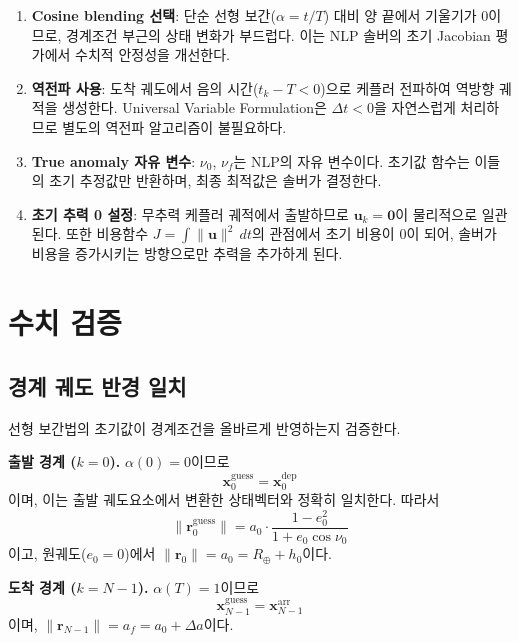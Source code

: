 \documentclass[11pt]{article}
\begin{document}
\begin{enumerate}[nosep]
  \item \textbf{Cosine blending 선택}: 단순 선형 보간($\alpha = t/T$) 대비 양 끝에서 기울기가 0이므로, 경계조건 부근의 상태 변화가 부드럽다. 이는 NLP 솔버의 초기 Jacobian 평가에서 수치적 안정성을 개선한다.

  \item \textbf{역전파 사용}: 도착 궤도에서 음의 시간($t_k - T < 0$)으로 케플러 전파하여 역방향 궤적을 생성한다. Universal Variable Formulation은 $\Delta t < 0$을 자연스럽게 처리하므로 별도의 역전파 알고리즘이 불필요하다.

  \item \textbf{True anomaly 자유 변수}: $\nu_0$, $\nu_f$는 NLP의 자유 변수이다. 초기값 함수는 이들의 초기 추정값만 반환하며, 최종 최적값은 솔버가 결정한다.

  \item \textbf{초기 추력 0 설정}: 무추력 케플러 궤적에서 출발하므로 $\mathbf{u}_k = \mathbf{0}$이 물리적으로 일관된다. 또한 비용함수 $J = \int \|\mathbf{u}\|^2\,dt$의 관점에서 초기 비용이 0이 되어, 솔버가 비용을 증가시키는 방향으로만 추력을 추가하게 된다.
\end{enumerate}


\section{수치 검증}
\label{sec:verification}

\subsection{경계 궤도 반경 일치}
\label{sec:verify_boundary}

선형 보간법의 초기값이 경계조건을 올바르게 반영하는지 검증한다.

\textbf{출발 경계 ($k = 0$).} $\alpha(0) = 0$이므로
\[
\mathbf{x}_0^{\text{guess}} = \mathbf{x}_0^{\text{dep}}
\]
이며, 이는 출발 궤도요소에서 변환한 상태벡터와 정확히 일치한다. 따라서
\[
\|\mathbf{r}_0^{\text{guess}}\| = a_0 \cdot \frac{1 - e_0^2}{1 + e_0 \cos\nu_0}
\]
이고, 원궤도($e_0 = 0$)에서 $\|\mathbf{r}_0\| = a_0 = R_\oplus + h_0$이다.

\textbf{도착 경계 ($k = N-1$).} $\alpha(T) = 1$이므로
\[
\mathbf{x}_{N-1}^{\text{guess}} = \mathbf{x}_{N-1}^{\text{arr}}
\]
이며, $\|\mathbf{r}_{N-1}\| = a_f = a_0 + \Delta a$이다.
\end{document}
